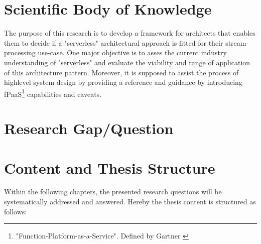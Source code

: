 \section{Scientific Body of Knowledge}


The purpose of this research is to develop a framework for architects that enables them to decide if a "serverless" architectural approach is fitted for their stream-processing use-case.
One major objective is to asses the current industry understanding of "serverless" and evaluate the viability and range of application of this architecture pattern.
Moreover, it is supposed to assist the process of highlevel system design by providing a reference and guidance by introducing fPaaS\footnote{"Function-Platform-as-a-Service". Defined by Gartner \autocite{Chandrasekaran2017EvolutionWhen}} capabilities and caveats. 



\section{Research Gap/Question}




\section{Content and Thesis Structure}

Within the following chapters, the presented research questions will be systematically addressed and answered. Hereby the thesis content is structured as follows:

